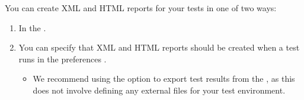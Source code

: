 % 
%
%
You can create XML and HTML reports for your tests in one of two ways:

\begin{enumerate}
\item In the \gdtestsummaryview{} .
\item You can specify that XML and HTML reports should be created when a test runs in the preferences  .
\begin{itemize}
\item We recommend using the option to export test results from the \gdtestsummaryview{}, as this does not involve defining any external files for your test environment. 
\end{itemize}
\end{enumerate}


